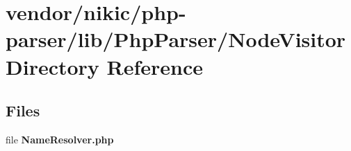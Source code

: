 \section{vendor/nikic/php-\/parser/lib/\+Php\+Parser/\+Node\+Visitor Directory Reference}
\label{dir_a228d916abe8765443029e953a6c9c1c}
\subsection*{Files}
\begin{DoxyCompactItemize}
\item 
file {\bf Name\+Resolver.\+php}
\end{DoxyCompactItemize}
